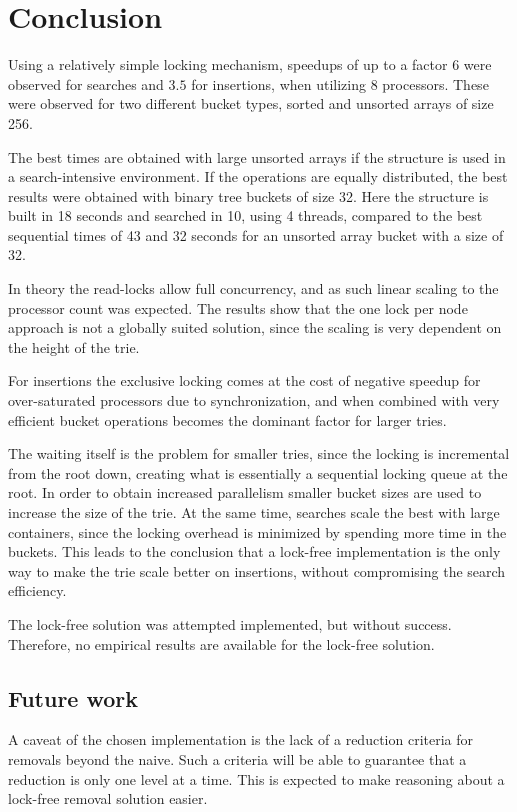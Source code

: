 \chapter{Conclusion}

Using a relatively simple locking mechanism, speedups of up to a factor $6$
were observed for searches and $3.5$ for insertions, when utilizing 8
processors. These were observed for two different bucket types, sorted
and unsorted arrays of size 256.

The best times are obtained with large unsorted arrays if the structure is
used in a search-intensive environment. If the operations are equally
distributed, the best results were obtained with binary tree buckets of size 32.
Here the structure is built in 18 seconds and searched in 10, using 4 threads,
compared to the best sequential times of 43 and 32 seconds for an unsorted
array bucket with a size of 32.


In theory the read-locks allow full concurrency, and as such linear scaling to the
processor count was expected. The results show that the one lock per node
approach is not a globally suited solution, since the scaling is very dependent
on the height of the trie.

For insertions the exclusive locking comes at the cost of negative speedup for
over-saturated processors due to synchronization, and when combined with very
efficient bucket operations becomes the dominant factor for larger tries.

The waiting itself is the problem for smaller tries, since the locking is
incremental from the root down, creating what is essentially a sequential
locking queue at the root. In order to obtain increased parallelism smaller
bucket sizes are used to increase the size of the trie. At the same time,
searches scale the best with large containers, since the locking overhead
is minimized by spending more time in the buckets.
This leads to the conclusion that a lock-free implementation is the only
way to make the trie scale better on insertions, without compromising
the search efficiency.

The lock-free solution was attempted implemented, but without success.
Therefore, no empirical results are available for the lock-free solution.

\section{Future work}
A caveat of the chosen implementation is the lack of a reduction criteria
for removals beyond the naive. Such a criteria will be able to guarantee
that a reduction is only one level at a time. This is expected to  make
reasoning about a lock-free removal solution easier.

